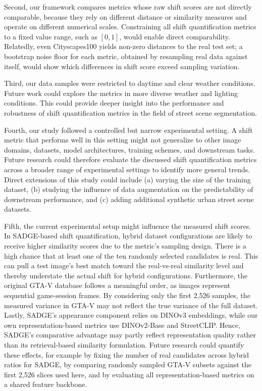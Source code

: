 \documentclass[conference]{IEEEtran}
\begin{document}
Second, our framework compares metrics whose raw shift scores are not directly comparable, because they rely on different distance or similarity measures and operate on different numerical scales. Constraining all shift quantification metrics to a fixed value range, such as $[0,1]$, would enable direct comparability. Relatedly, even Cityscapes100 yields non-zero distances to the real test set; a bootstrap noise floor for each metric, obtained by resampling real data against itself, would show which differences in shift score exceed sampling variation.

Third, our data samples were restricted to daytime and clear weather conditions. Future work could explore the metrics in more diverse weather and lighting conditions. This could provide deeper insight into the performance and robustness of shift quantification metrics in the field of street scene segmentation.

Fourth, our study followed a controlled but narrow experimental setting. A shift metric that performs well in this setting might not generalize to other image domains, datasets, model architectures, training schemes, and downstream tasks. Future research could therefore evaluate the discussed shift quantification metrics across a broader range of experimental settings to identify more general trends. Direct extensions of this study could include (a) varying the size of the training dataset, (b) studying the influence of data augmentation on the predictability of downstream performance, and (c) adding additional synthetic urban street scene datasets.

Fifth, the current experimental setup might influence the measured shift scores. In SADGE-based shift quantification, hybrid dataset configurations are likely to receive higher similarity scores due to the metric's sampling design. There is a high chance that at least one of the ten randomly selected candidates is real. This can pull a test image's best match toward the real-vs-real similarity level and thereby understate the actual shift for hybrid configurations. Furthermore, the original GTA-V database follows a meaningful order, as images represent sequential game-session frames. By considering only the first 2,526 samples, the measured variance in GTA-V may not reflect the true variance of the full dataset. Lastly, SADGE's appearance component relies on DINOv3 embeddings, while our own representation-based metrics use DINOv2-Base and StreetCLIP. Hence, SADGE's comparative advantage may partly reflect representation quality rather than its retrieval-based similarity formulation. Future research could quantify these effects, for example by fixing the number of real candidates across hybrid ratios for SADGE, by comparing randomly sampled GTA-V subsets against the first 2,526 slices used here, and by evaluating all representation-based metrics on a shared feature backbone.
\end{document}
